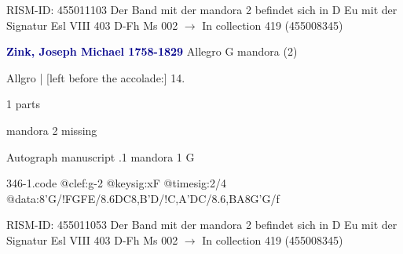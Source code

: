 \documentclass[twocolumn]{book}
\begin{document}
\newline RISM-ID: 455011103
\newline Der Band mit der mandora 2 befindet sich in D Eu mit der Signatur Esl VIII 403
\newline D-Fh  Ms 002
\newline $\rightarrow$ In collection 419 (455008345)

\newline \par \vspace{7pt} \textcolor{darkblue}{\textbf{Zink, Joseph Michael  1758-1829}}
\newline Allegro  G  
\newline mandora (2)
\newline \begin{itshape}[f.11r, at left:] Allgro | [left before the accolade:] 14.\end{itshape} 
\newline \textcolor{darkblue}{}  1 parts  
\newline \begin{small} mandora 2 missing\end{small} 
\newline Autograph manuscript
.1  mandora 1  G  
\begin{filecontents*}{346-1.code}
@clef:g-2
@keysig:xF
@timesig:2/4
@data:8'G/!FGFE/{8.6DC}8,B'D/!{C,A}'DC/{8.6,BA}8G'G/f
\end{filecontents*}
\newline
%

\newline RISM-ID: 455011053
\newline Der Band mit der mandora 2 befindet sich in D Eu mit der Signatur Esl VIII 403
\newline D-Fh  Ms 002
\newline $\rightarrow$ In collection 419 (455008345)
\end{document}
